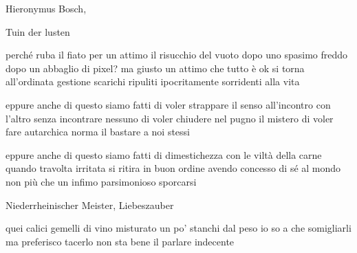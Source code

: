 \clearpage


\begin{artItem}
	Hieronymus Bosch, \begin{otherlanguage}{dutch}%
		Tuin der lusten%
	\end{otherlanguage}
\end{artItem}

\begin{poem}
	\begin{stanza}
		perché ruba il fiato per un attimo\verseline
		il risucchio del vuoto\verseline
		dopo uno spasimo freddo\verseline
		dopo un abbaglio di pixel?\verseline
		ma giusto un attimo che tutto è ok\verseline
		si torna all'ordinata gestione\verseline
		scarichi ripuliti ipocritamente\verseline
		sorridenti alla vita
	\end{stanza}

	\begin{stanza}
		eppure anche di questo siamo fatti\verseline
		di voler strappare il senso\verseline
		all'incontro con l'altro\verseline
		senza incontrare nessuno\verseline
		di voler chiudere nel pugno il mistero\verseline
		di voler fare autarchica norma\verseline
		il bastare a noi stessi
	\end{stanza}

	\begin{stanza}
		eppure anche di questo siamo fatti\verseline
		di dimestichezza con le viltà della carne\verseline
		quando travolta irritata\verseline
		si ritira in buon ordine\verseline
		avendo concesso di sé al mondo\verseline
		non più che un infimo parsimonioso\verseline
		sporcarsi
	\end{stanza}
\end{poem}

\clearpage


\begin{artItem}
	\begin{otherlanguage}{german}%
		Niederrheinischer Meister, Liebeszauber%
	\end{otherlanguage}
\end{artItem}

\begin{poem}
	\begin{stanza}
		quei calici gemelli\verseline
		di vino misturato\verseline
		un po' stanchi dal peso\verseline
		io so a che somigliarli\verseline
		ma preferisco tacerlo\verseline
		non sta bene il parlare indecente
	\end{stanza}
\end{poem}


